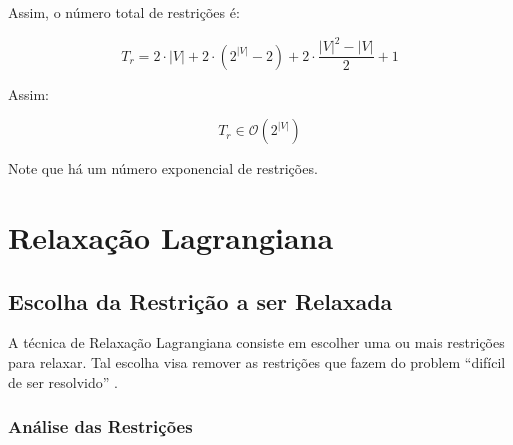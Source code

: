 \documentclass{article}
\newcommand{\abs}[1]{\ensuremath{\left| #1 \right|}}
\newcommand{\vertices}{\ensuremath{V}}
\newcommand{\nvertices}{\ensuremath{\abs{\vertices}}}
\newcommand{\ncycles}{2}
\newcommand{\totalconstraints}{\ensuremath{T_r}}
\newcommand{\bigo}[1]{\ensuremath{\mathcal{O}\left( #1 \right)}}
\begin{document}
Assim, o número total de restrições é:

\begin{equation}
	\totalconstraints =
		  \ncycles \cdot \abs{\vertices}
		+ \ncycles \cdot \left( 2^{\abs{\vertices}} - 2\right)
		+ \ncycles \cdot \dfrac{\abs{\vertices}^2 - \abs{\vertices}}{2}
		+ 1
\end{equation}

Assim:

\begin{equation}
	\label{eq:number of constraints}
	\totalconstraints \in \bigo{2^{\nvertices}}
\end{equation}

Note que há um número exponencial de restrições.

%

\section{Relaxação Lagrangiana}
\label{sec:lagrangian relaxation}

\subsection{Escolha da Restrição a ser Relaxada}

A técnica de Relaxação Lagrangiana consiste em escolher uma ou mais restrições para relaxar. Tal escolha visa remover as restrições que fazem do problem ``difícil de ser resolvido'' \cite{bib:linear-optimization-intro}.

\subsubsection{Análise das Restrições}
\end{document}
